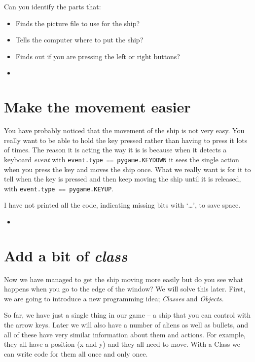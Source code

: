 \documentclass[12pt]{article}
\newcommand{\pythonscript}[2]{
\begin{itemize}
\item[]
\end{itemize}
}
\newenvironment{hint}{
  \begin{tcolorbox}[colback=green!5,colframe=green!40!black,title=Note]}
{\end{tcolorbox}}
\begin{document}
\begin{hint}
Can you identify the parts that:

\begin{itemize}
  \item Finds the picture file to use for the ship?
  \item Tells the computer where to put the ship?
  \item Finds out if you are pressing the left or right buttons?
\end{itemize}
\end{hint}

\pythonscript{controls}{Controlling the ship}

\section{Make the movement easier}

You have probably noticed that the movement of the ship is not very easy. You
really want to be able to hold the key pressed rather than having to press it
lots of times. The reason it is acting the way it is is because when it
detects a keyboard \emph{event} with \texttt{event.type == pygame.KEYDOWN} it sees
the single action when you press the key and moves the ship once. What we
really want is for it to tell when the key is pressed and then keep moving
the ship until it is released, with \texttt{event.type == pygame.KEYUP}.

\begin{hint}
I have not printed all the code, indicating missing bits with `\ldots', to save
space.
\end{hint}

\pythonscript{smoothcontrol}{Easier control of the ship}

\section{Add a bit of \emph{class}}

Now we have managed to get the ship moving more easily but do you see what
happens when you go to the edge of the window? We will solve this later.
First, we are going to introduce a new
programming idea; \emph{Classes} and \emph{Objects.}

So far, we have just a single thing in our game -- a ship that you can control
with the arrow keys. Later we will also have a number of aliens as well as
bullets, and all of these have very similar information about them and actions.
For example, they all have a position (x and y) and they all need to move.
With a Class we can write code for them all once and only once.
\end{document}
